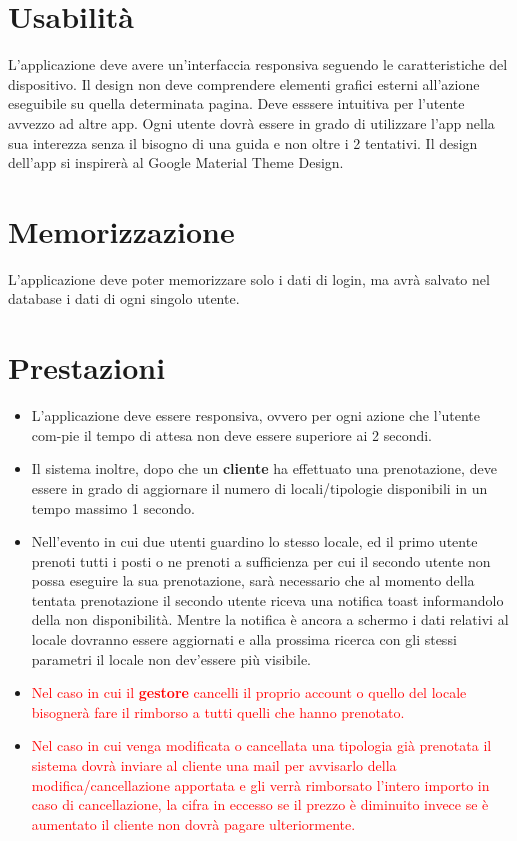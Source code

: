 \section{Usabilità} 
L'applicazione deve avere un'interfaccia responsiva seguendo le caratteristiche del dispositivo. 
Il design non deve comprendere elementi grafici esterni all'azione eseguibile su quella determinata pagina.
Deve esssere intuitiva per l'utente avvezzo ad altre app. 
Ogni utente dovrà essere in grado di utilizzare l'app nella sua interezza senza il bisogno di una guida e non oltre
i 2 tentativi. 
Il design dell'app si inspirerà al Google Material Theme Design.

\section{Memorizzazione} 
L'applicazione deve poter memorizzare solo i dati di login, ma avrà salvato nel database i dati di
ogni singolo utente.

\section{Prestazioni} \label{sec:prestazioni}
\begin{itemize}
    \item L'applicazione deve essere responsiva, ovvero per ogni azione che l'utente com-pie il tempo di attesa non deve essere
    superiore ai 2 secondi.

    \item Il sistema inoltre, dopo che un \textbf{cliente} ha effettuato una prenotazione, deve essere in grado di aggiornare il
    numero di locali/tipologie disponibili in un tempo massimo 1 secondo.

    \item Nell'evento in cui due utenti guardino lo stesso locale, ed il primo utente prenoti tutti i posti o ne prenoti a 
    sufficienza per cui il secondo utente non possa eseguire la sua prenotazione, sarà necessario che al momento della 
    tentata prenotazione il secondo utente riceva una notifica toast informandolo della non disponibilità. Mentre la notifica 
    è ancora a schermo i dati relativi al locale dovranno essere aggiornati e alla prossima ricerca con gli stessi parametri 
    il locale non dev'essere più visibile.

    \item \textcolor{red}{Nel caso in cui il \textbf{gestore} cancelli il proprio account o quello del locale bisognerà fare il 
    rimborso a tutti quelli che hanno prenotato.}

    \item \textcolor{red}{Nel caso in cui venga modificata o cancellata una tipologia già prenotata il sistema dovrà inviare al cliente una mail per 
    avvisarlo della modifica/cancellazione apportata e gli verrà rimborsato l'intero importo in caso di cancellazione, la cifra in 
    eccesso se il prezzo è diminuito invece se è aumentato il cliente non dovrà pagare ulteriormente.}
\end{itemize} 

